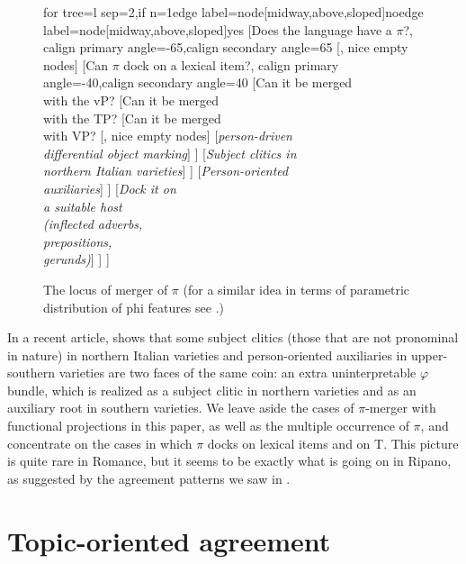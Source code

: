 \documentclass[output=paper
,modfonts
,nonflat]{langsci/langscibook}
\begin{document}
\begin{figure}[h]
\caption{\label{ex-dalessandro:20} The locus of merger of $\pi$ (for a similar idea in terms of parametric distribution of phi features see \citealt{Van_der_WalTA}.)}
	\begin{forest} for tree={l sep=2\baselineskip,if n=1{edge label={node[midway,above,sloped]{no}}}{edge label={node[midway,above,sloped]{yes}}}}
	[Does the language have a $\pi$?, calign primary angle=-65,calign secondary angle=65
	[, nice empty nodes]
	[Can $\pi$ dock on a lexical item?, calign primary angle=-40,calign secondary angle=40
	[Can it be merged\\ with the vP?
	[Can it be merged\\ with the TP?
	[Can it be merged\\ with VP?
	[, nice empty nodes]
	[\textit{person-driven}\\ \textit{differential object marking}] ]
	[\textit{Subject clitics in}\\ \textit{northern Italian varieties}] ]
	[\textit{Person-oriented} \\ \textit{auxiliaries}] ]
	[\textit{Dock it on}\\ \textit{a suitable host}\\ \textit{(inflected adverbs,}\\ \textit{prepositions,}\\ \textit{gerunds)}] ]	
	] 
	\end{forest}
\end{figure}

In a recent article, \citet{D`Alessandro2017} shows that some subject clitics (those that are not pronominal in nature) in northern Italian varieties and person-ori\-ent\-ed auxiliaries in upper-southern varieties are two faces of the same coin: an extra uninterpretable $\varphi$ bundle, which is realized as a subject clitic in northern varieties and as an auxiliary root in southern varieties. We leave aside the cases of $\pi $-merger with functional projections in this paper, as well as the multiple occurrence of $\pi$, and concentrate on the cases in which $\pi$ docks on lexical items and on T. This picture is quite rare in Romance, but it seems to be exactly what is going on in Ripano, as suggested by the agreement patterns we saw in .

\section{Topic-oriented agreement}\label{sec-dalessandro:4}
\end{document}

